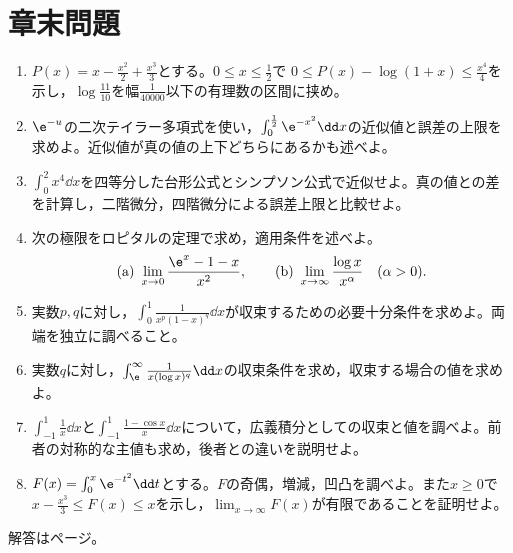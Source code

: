 \section*{章末問題}
\begin{enumerate}[label=\textbf{\thechapter.\arabic*},leftmargin=*]
 \item\label{問:十一対数近似}
 $P(x)=x-\frac{x^2}{2}+\frac{x^3}{3}$とする。$0\leq x\leq\frac12$で
 $0\leq P(x)-\log(1+x)\leq\frac{x^4}{4}$を示し，$\log\frac{11}{10}$を幅$\frac1{40000}$以下の有理数の区間に挟め。
 \item\label{問:十一指数積分近似}
 $\e^{-u}$の二次テイラー多項式を使い，$\int_0^{\frac12}\e^{-x^2}\dd x$の近似値と誤差の上限を求めよ。近似値が真の値の上下どちらにあるかも述べよ。
 \item\label{問:十一数値積分}
 $\int_0^2x^4\dd x$を四等分した台形公式とシンプソン公式で近似せよ。真の値との差を計算し，二階微分，四階微分による誤差上限と比較せよ。
 \item\label{問:十一ロピタル}
 次の極限をロピタルの定理で求め，適用条件を述べよ。
 \[
 \text{(a)}\ \lim_{x\to0}\frac{\e^x-1-x}{x^2},
 \qquad
 \text{(b)}\ \lim_{x\to\infty}\frac{\log x}{x^{\alpha}}\quad(\alpha>0).
 \]
 \item\label{問:十一両端比較}
 実数$p,q$に対し，$\int_0^1\frac1{x^p(1-x)^q}\dd x$が収束するための必要十分条件を求めよ。両端を独立に調べること。
 \item\label{問:十一対数尾部}
 実数$q$に対し，$\int_{\e}^{\infty}\frac1{x(\log x)^q}\dd x$の収束条件を求め，収束する場合の値を求めよ。
 \item\label{問:十一主値区別}
 $\int_{-1}^1\frac1x\dd x$と$\int_{-1}^1\frac{1-\cos x}{x}\dd x$について，広義積分としての収束と値を調べよ。前者の対称的な主値も求め，後者との違いを説明せよ。
 \item\label{問:十一積分定義関数}
 $F(x)=\int_0^x\e^{-t^2}\dd t$とする。$F$の奇偶，増減，凹凸を調べよ。また$x\geq0$で$x-\frac{x^3}{3}\leq F(x)\leq x$を示し，$\lim_{x\to\infty}F(x)$が有限であることを証明せよ。
\end{enumerate}

\smallskip\noindent 解答は\pageref{解答:第11章}ページ。
